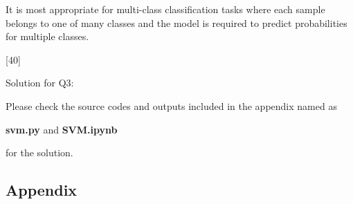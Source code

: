 \documentclass[12pt,letterpaper, onecolumn]{exam}
\begin{document}
\begin{questions}
\begin{parts}
\begin{solution}
\begin{enumerate}[label=(\alph*)]
                It is most appropriate for multi-class classification tasks where each sample belongs to one of many classes and the model is required to predict probabilities for multiple classes.

            \end{enumerate}

        \end{solution}
        
    \end{parts}

    \pagebreak

    [40]

    Solution for Q3:

    \begin{solution}

        Please check the source codes and outputs included in the appendix named as

        \begin{center}
            \textbf{svm.py} and \textbf{SVM.ipynb} 
        \end{center}
        
        for the solution.
    \end{solution}

    \pagebreak
    
\end{questions}

\begin{appendix}
    \centering
    \begin{flushleft}  
      \section{Appendix}
      
      
    \end{flushleft}
\end{appendix}
\end{document}

